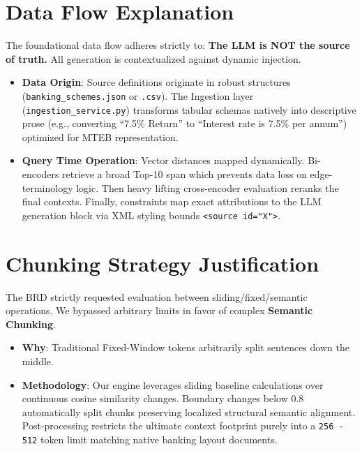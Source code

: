 \documentclass[11pt,a4paper]{article}
\begin{document}
\section{Data Flow Explanation}
The foundational data flow adheres strictly to: \textbf{The LLM is NOT the source of truth.} All generation is contextualized against dynamic injection.

\begin{itemize}
    \item \textbf{Data Origin}: Source definitions originate in robust structures (\texttt{banking\_schemes.json} or \texttt{.csv}). The Ingestion layer (\texttt{ingestion\_service.py}) transforms tabular schemas natively into descriptive prose (e.g., converting ``7.5\% Return'' to ``Interest rate is 7.5\% per annum'') optimized for MTEB representation.
    \item \textbf{Query Time Operation}: Vector distances mapped dynamically. Bi-encoders retrieve a broad Top-10 span which prevents data loss on edge-terminology logic. Then heavy lifting cross-encoder evaluation reranks the final contexts. Finally, constraints map exact attributions to the LLM generation block via XML styling bounds \texttt{<source id="X">}.
\end{itemize}

\section{Chunking Strategy Justification}
The BRD strictly requested evaluation between sliding/fixed/semantic operations. We bypassed arbitrary limits in favor of complex \textbf{Semantic Chunking}.

\begin{itemize}
    \item \textbf{Why}: Traditional Fixed-Window tokens arbitrarily split sentences down the middle.
    \item \textbf{Methodology}: Our engine leverages sliding baseline calculations over continuous cosine similarity changes. Boundary changes below 0.8 automatically split chunks preserving localized structural semantic alignment. Post-processing restricts the ultimate context footprint purely into a \texttt{256 - 512} token limit matching native banking layout documents.
\end{itemize}
\end{document}
